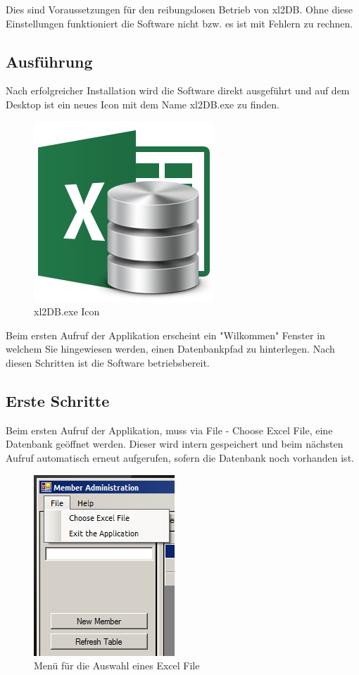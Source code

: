 \documentclass{article}
\begin{document}
Dies sind Voraussetzungen für den reibungslosen Betrieb von xl2DB. Ohne diese Einstellungen funktioniert die Software nicht bzw. es ist mit Fehlern zu rechnen.
\newpage
\subsection*{Ausführung}
Nach erfolgreicher Installation wird die Software direkt ausgeführt und auf dem Desktop ist ein neues Icon mit dem Name xl2DB.exe zu finden.

\begin{figure}[h]
	\begin{center}
		\centering
		\includegraphics[width=0.1\paperwidth]{Icon}
		\caption{xl2DB.exe Icon}
	\end{center}
\end{figure}

Beim ersten Aufruf der Applikation erscheint ein "Wilkommen" Fenster in welchem Sie hingewiesen werden, einen Datenbankpfad zu hinterlegen. Nach diesen Schritten ist die Software betriebsbereit.

\subsection*{Erste Schritte}
Beim ersten Aufruf der Applikation, muss via File - Choose Excel File, eine Datenbank geöffnet werden. Dieser wird intern gespeichert und beim nächsten Aufruf automatisch erneut aufgerufen, sofern die Datenbank noch vorhanden ist.

\begin{figure}[h]
	\begin{center}
		\includegraphics[width=0.2\paperwidth]{Pfads}
		\caption{Menü für die Auswahl eines Excel File}
	\end{center}
\end{figure}
\end{document}
